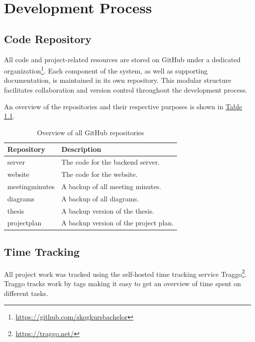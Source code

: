 \chapter{Development Process}

\section{Code Repository}
All code and project-related resources are stored on GitHub under a dedicated organization\footnote{\url{https://github.com/skogkursbachelor}}. Each component of the system, as well as supporting documentation, is maintained in its own repository. This modular structure facilitates collaboration and version control throughout the development process.

An overview of the repositories and their respective purposes is shown in \hyperref[tab:github_repositories]{Table \ref*{tab:github_repositories}}.

\begin{table}[h]
    \centering
    \begin{tabular}{l|l}
        \hline
        \textbf{Repository} & \textbf{Description} \\
        \hline
        server & The code for the backend server. \\
        website & The code for the website. \\
        \hline
        meetingminutes & A backup of all meeting minutes. \\
        diagrams & A backup of all diagrams. \\
        thesis & A backup version of the thesis. \\
        projectplan & A backup version of the project plan. \\
        \hline
    \end{tabular}
    \caption{Overview of all GitHub repositories\footnotemark}
    \label{tab:github_repositories}
\end{table}

\section{Time Tracking}
All project work was tracked using the self-hosted time tracking service Traggo\footnote{\url{https://traggo.net/}}. Traggo tracks work by tags making it easy to get an overview of time spent on different tasks.

